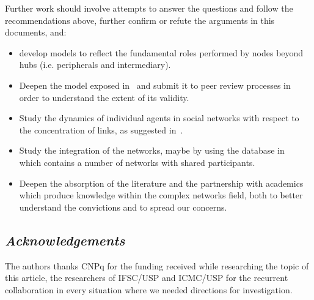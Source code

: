 \documentclass[12pt,fleqn]{article}
\begin{document}
Further work should involve attempts to answer the questions and follow the recommendations above,
further confirm or refute the arguments in this documents, and:
\begin{itemize}
	\item develop models to reflect the fundamental roles performed by nodes beyond hubs (i.e.
		peripherals and intermediary).
	\item Deepen the model exposed in~\cite{fabbri3} and submit it to peer review processes in order
		to understand the extent of its validity.
	\item Study the dynamics of individual agents in social networks with respect to the concentration of links,
		as suggested in~\cite{fabbri1,fabbri2,versinus}.
	\item Study the integration of the networks, maybe by using the database in~\cite{losd} which
		contains a number of networks with shared participants.
	\item Deepen the absorption of the literature and the partnership with academics which produce
		knowledge within the complex networks field, both to better understand the convictions
		and to spread our concerns.
\end{itemize}

\subsection*{\textit{Acknowledgements}}
The authors thanks CNPq for the funding received while researching the topic of this article,
the researchers of IFSC/USP and ICMC/USP for the recurrent collaboration in every situation
where we needed directions for investigation.
\end{document}
